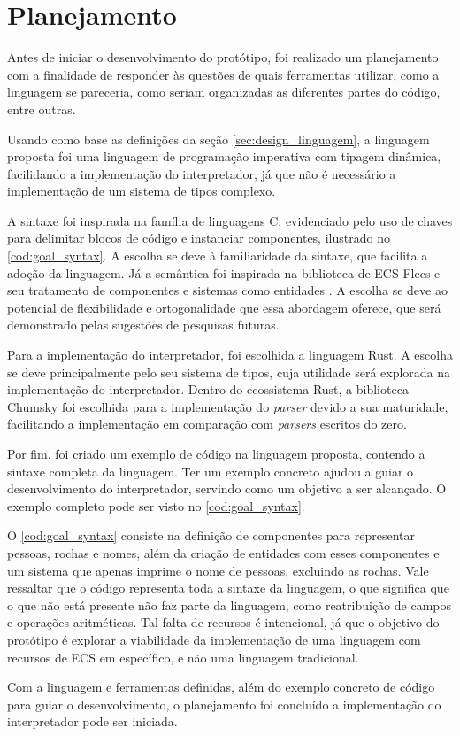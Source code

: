 \section{Planejamento}

Antes de iniciar o desenvolvimento do protótipo, foi realizado um planejamento com a finalidade de responder às questões de quais ferramentas utilizar, como a linguagem se pareceria, como seriam organizadas as diferentes partes do código, entre outras.

Usando como base as definições da seção \ref{sec:design_linguagem}, a linguagem proposta foi uma linguagem de programação imperativa com tipagem dinâmica, facilidando a implementação do interpretador, já que não é necessário a implementação de um sistema de tipos complexo.

A sintaxe foi inspirada na família de linguagens C, evidenciado pelo uso de chaves para delimitar blocos de código e instanciar componentes, ilustrado no \autoref{cod:goal_syntax}. A escolha se deve à familiaridade da sintaxe, que facilita a adoção da linguagem. Já a semântica foi inspirada na biblioteca de ECS Flecs e seu tratamento de componentes e sistemas como entidades \cite{flecs}. A escolha se deve ao potencial de flexibilidade e ortogonalidade que essa abordagem oferece, que será demonstrado pelas sugestões de pesquisas futuras.

Para a implementação do interpretador, foi escolhida a linguagem Rust. A escolha se deve principalmente pelo seu sistema de tipos, cuja utilidade será explorada na implementação do interpretador. Dentro do ecossistema Rust, a biblioteca Chumsky foi escolhida para a implementação do \textit{parser} devido a sua maturidade, facilitando a implementação em comparação com \textit{parsers} escritos do zero.

Por fim, foi criado um exemplo de código na linguagem proposta, contendo a sintaxe completa da linguagem. Ter um exemplo concreto ajudou a guiar o desenvolvimento do interpretador, servindo como um objetivo a ser alcançado. O exemplo completo pode ser visto no \autoref{cod:goal_syntax}.

\codigoRust

\vspace{-1em}

O \autoref{cod:goal_syntax} consiste na definição de componentes para representar pessoas, rochas e nomes, além da criação de entidades com esses componentes e um sistema que apenas imprime o nome de pessoas, excluindo as rochas. Vale ressaltar que o código representa toda a sintaxe da linguagem, o que significa que o que não está presente não faz parte da linguagem, como reatribuição de campos e operações aritméticas. Tal falta de recursos é intencional, já que o objetivo do protótipo é explorar a viabilidade da implementação de uma linguagem com recursos de ECS em específico, e não uma linguagem tradicional.

Com a linguagem e ferramentas definidas, além do exemplo concreto de código para guiar o desenvolvimento, o planejamento foi concluído a implementação do interpretador pode ser iniciada.

